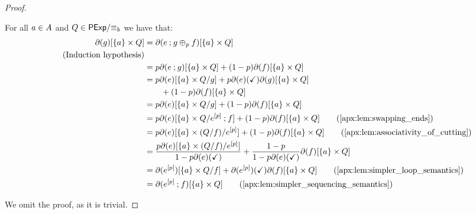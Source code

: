 \begin{proof}
\begin{itemize}
        For all $a \in {A}$ and $Q \in {\mathsf{PExp}}/{\equiv_b}$ we have that:
        \begin{align*}
            \partial(g)[\{a\} \times Q] &= \partial(e \seq g \oplus_p f)[\{a\} \times Q] \\\tag{Induction hypothesis} \\
            &=p \partial(e \seq g)[\{a\} \times Q] + (1-p)\partial(f)[\{a\} \times Q]\\
            &= p \partial(e)[\{a\} \times Q/{g}] + p \partial(e)(\checkmark)\partial(g)[\{a\}\times Q]\\&\quad\quad + (1-p)\partial(f)[\{a\} \times Q] \\
            &= p\partial(e)[\{a\} \times Q/g] + (1-p)\partial(f)[\{a\} \times Q] \\
            &=p\partial(e)[\{a\} \times Q/{e^{[p]}\seq f}] + (1-p)\partial(f)[\{a\} \times Q] \tag{\Cref{apx:lem:swapping_ends}}\\
            &=p\partial(e)[\{a\} \times {(Q/{f})}/{e^{[p]}}] + (1-p)\partial(f)[\{a\} \times Q] \tag{\Cref{apx:lem:associativity_of_cutting}}\\
            &=\frac{p\partial(e)[\{a\} \times {(Q/{f})}/{e^{[p]}}]}{1-p\partial(e)(\checkmark)} + \frac{1-p}{1-p\partial(e)(\checkmark)}\partial(f)[\{a\} \times Q] \\
            &= \partial(e^{[p]})[\{a\} \times Q/f] + \partial(e^{[p]})(\checkmark)\partial(f)[\{a\} \times Q] \tag{\Cref{apx:lem:simpler_loop_semantics}}\\
            &=\partial(e^{[p]}\seq f)[\{a\} \times Q] \tag{\Cref{apx:lem:simpler_sequencing_semantics}}
        \end{align*}
    \end{itemize}

    \item[]  We omit the proof, as it is trivial.


\end{proof}
